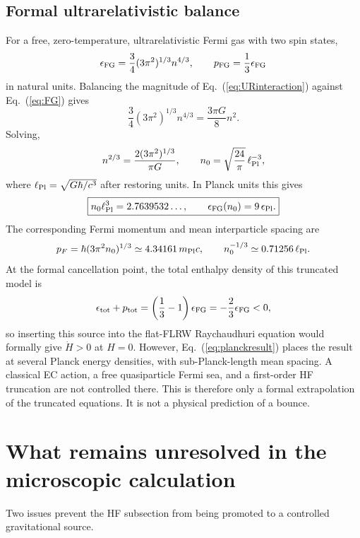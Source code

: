 \documentclass[11pt]{article}
\begin{document}
\subsection{Formal ultrarelativistic balance}
For a free, zero-temperature, ultrarelativistic Fermi gas with two spin states,
\begin{equation}
\epsilon_{\rm FG}=\frac34(3\pi^2)^{1/3}n^{4/3},
\qquad p_{\rm FG}=\frac13\epsilon_{\rm FG}
\label{eq:FG}
\end{equation}
in natural units. Balancing the magnitude of Eq.~(\ref{eq:URinteraction}) against Eq.~(\ref{eq:FG}) gives
\begin{equation}
\frac34(3\pi^2)^{1/3}n^{4/3}
=\frac{3\pi G}{8}n^2.
\end{equation}
Solving,
\begin{equation}
n^{2/3}=\frac{2(3\pi^2)^{1/3}}{\pi G},
\qquad
n_0=\sqrt{\frac{24}{\pi}}\,\ell_{\rm Pl}^{-3},
\label{eq:n0}
\end{equation}
where $\ell_{\rm Pl}=\sqrt{G\hbar/c^3}$ after restoring units. In Planck units this gives
\begin{equation}
\boxed{n_0\ell_{\rm Pl}^3=2.7639532\ldots,\qquad
\epsilon_{\rm FG}(n_0)=9\,\epsilon_{\rm Pl}.}
\label{eq:planckresult}
\end{equation}
The corresponding Fermi momentum and mean interparticle spacing are
\begin{equation}
p_F=\hbar(3\pi^2n_0)^{1/3}
\simeq4.34161\,m_{\rm Pl}c,
\qquad n_0^{-1/3}\simeq0.71256\,\ell_{\rm Pl}.
\end{equation}
At the formal cancellation point, the total enthalpy density of this truncated model is
\begin{equation}
\epsilon_{\rm tot}+p_{\rm tot}
=\left(\frac13-1\right)\epsilon_{\rm FG}
=-\frac23\epsilon_{\rm FG}<0,
\end{equation}
so inserting this source into the flat-FLRW Raychaudhuri equation would formally give $\dot H>0$ at $H=0$. However, Eq.~(\ref{eq:planckresult}) places the result at several Planck energy densities, with sub-Planck-length mean spacing. A classical EC action, a free quasiparticle Fermi sea, and a first-order HF truncation are not controlled there. This is therefore only a formal extrapolation of the truncated equations. It is not a physical prediction of a bounce.

\section{What remains unresolved in the microscopic calculation}
Two issues prevent the HF subsection from being promoted to a controlled gravitational source.
\end{document}
